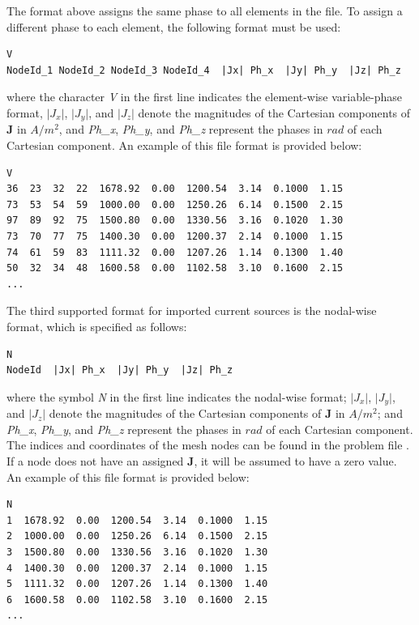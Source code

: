 The format above assigns the same phase to all elements in the file. To assign a different phase to each element, the following format must be used:
\begin{small}\begin{lstlisting}
V
NodeId_1 NodeId_2 NodeId_3 NodeId_4  |Jx| Ph_x  |Jy| Ph_y  |Jz| Ph_z
\end{lstlisting}\end{small} 
where the character \textit{V} in the first line indicates the element-wise variable-phase format, $\lvert J_x \rvert$, $\lvert J_y \rvert$, and $\lvert J_z \rvert$ denote the magnitudes of the Cartesian components of $\mathbf{J}$ in $A/m^{2}$, and \textit{Ph\_x}, \textit{Ph\_y}, and \textit{Ph\_z} represent the phases in $rad$ of each Cartesian component. An example of this file format is provided below:
\begin{small}\begin{lstlisting}
V
36  23  32  22  1678.92  0.00  1200.54  3.14  0.1000  1.15
73  53  54  59  1000.00  0.00  1250.26  6.14  0.1500  2.15
97  89  92  75  1500.80  0.00  1330.56  3.16  0.1020  1.30
73  70  77  75  1400.30  0.00  1200.37  2.14  0.1000  1.15
74  61  59  83  1111.32  0.00  1207.26  1.14  0.1300  1.40
50  32  34  48  1600.58  0.00  1102.58  3.10  0.1600  2.15
...
\end{lstlisting}\end{small} 
The third supported format for imported current sources is the nodal-wise format, which is specified as follows: 
\begin{small}\begin{lstlisting}
N
NodeId  |Jx| Ph_x  |Jy| Ph_y  |Jz| Ph_z
\end{lstlisting}\end{small} 
where the symbol \textit{N} in the first line indicates the nodal-wise format; $\lvert J_x \rvert$, $\lvert J_y \rvert$, and $\lvert J_z \rvert$ denote the magnitudes of the Cartesian components of $\mathbf{J}$ in $A/m^{2}$; and \textit{Ph\_x}, \textit{Ph\_y}, and \textit{Ph\_z} represent the phases in $rad$ of each Cartesian component. The indices and coordinates of the mesh nodes can be found in the problem file . If a node does not have an assigned \textbf{J}, it will be assumed to have a zero value. An example of this file format is provided below:
\begin{small}\begin{lstlisting}
N
1  1678.92  0.00  1200.54  3.14  0.1000  1.15
2  1000.00  0.00  1250.26  6.14  0.1500  2.15
3  1500.80  0.00  1330.56  3.16  0.1020  1.30
4  1400.30  0.00  1200.37  2.14  0.1000  1.15
5  1111.32  0.00  1207.26  1.14  0.1300  1.40
6  1600.58  0.00  1102.58  3.10  0.1600  2.15
...
\end{lstlisting}\end{small} 

